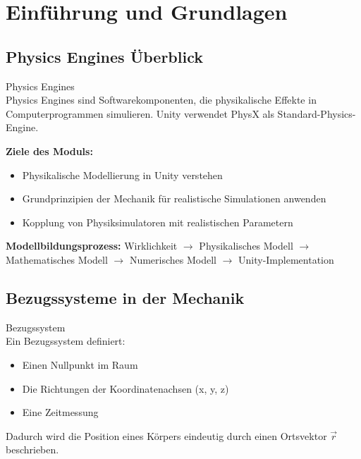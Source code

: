\section{Einführung und Grundlagen}

\subsection{Physics Engines Überblick}
\begin{concept}{Physics Engines}\\
    Physics Engines sind Softwarekomponenten, die physikalische Effekte in Computerprogrammen simulieren. Unity verwendet PhysX als Standard-Physics-Engine.
    
    \textbf{Ziele des Moduls:}
    \begin{itemize}
        \item Physikalische Modellierung in Unity verstehen
        \item Grundprinzipien der Mechanik für realistische Simulationen anwenden
        \item Kopplung von Physiksimulatoren mit realistischen Parametern
    \end{itemize}
\end{concept}

\begin{remark}
    \textbf{Modellbildungsprozess:}
    Wirklichkeit $\rightarrow$ Physikalisches Modell $\rightarrow$ Mathematisches Modell $\rightarrow$ Numerisches Modell $\rightarrow$ Unity-Implementation
\end{remark}

\subsection{Bezugssysteme in der Mechanik}
\begin{definition}{Bezugssystem}\\
    Ein Bezugssystem definiert:
    \begin{itemize}
        \item Einen Nullpunkt im Raum
        \item Die Richtungen der Koordinatenachsen (x, y, z)
        \item Eine Zeitmessung
    \end{itemize}
    Dadurch wird die Position eines Körpers eindeutig durch einen Ortsvektor $\vec{r}$ beschrieben.
\end{definition}


